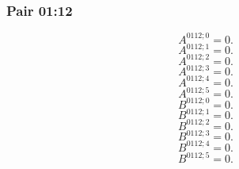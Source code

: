 \documentclass[11pt,a4paper]{article}
\begin{document}
\subsubsection{Pair 01:12}
\begin{equation}
A^{0112;0}=0.
\label{eq:cat-map-114}
\end{equation}
\begin{equation}
A^{0112;1}=0.
\label{eq:cat-map-115}
\end{equation}
\begin{equation}
A^{0112;2}=0.
\label{eq:cat-map-116}
\end{equation}
\begin{equation}
A^{0112;3}=0.
\label{eq:cat-map-117}
\end{equation}
\begin{equation}
A^{0112;4}=0.
\label{eq:cat-map-118}
\end{equation}
\begin{equation}
A^{0112;5}=0.
\label{eq:cat-map-119}
\end{equation}
\begin{equation}
B^{0112;0}=0.
\label{eq:cat-map-120}
\end{equation}
\begin{equation}
B^{0112;1}=0.
\label{eq:cat-map-121}
\end{equation}
\begin{equation}
B^{0112;2}=0.
\label{eq:cat-map-122}
\end{equation}
\begin{equation}
B^{0112;3}=0.
\label{eq:cat-map-123}
\end{equation}
\begin{equation}
B^{0112;4}=0.
\label{eq:cat-map-124}
\end{equation}
\begin{equation}
B^{0112;5}=0.
\label{eq:cat-map-125}
\end{equation}
\end{document}
